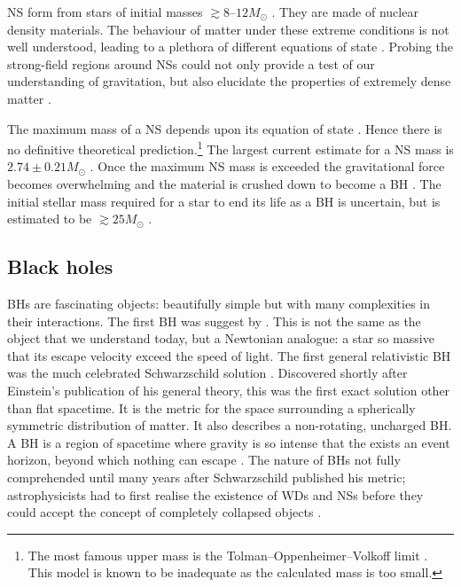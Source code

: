 NS form from stars of initial masses $\gtrsim 8$--$12 M_\odot$ \citep{Woosley2002,Poelarends2008,Langer2012}. They are made of nuclear density materials. The behaviour of matter under these extreme conditions is not well understood, leading to a plethora of different equations of state \citep{Lattimer2012}. Probing the strong-field regions around NSs could not only provide a test of our understanding of gravitation, but also elucidate the properties of extremely dense matter \citep[e.g.,][]{Read2009,Ozel2009,Lackey2012}.

The maximum mass of a NS depends upon its equation of state \citep[section 9.3]{Shapiro1983}. Hence there is no definitive theoretical prediction.\footnote{The most famous upper mass is the Tolman--Oppenheimer--Volkoff limit \citep{Tolman1939,Oppenheimer1939}. This model is known to be inadequate as the calculated mass is too small.} The largest current estimate for a NS mass is $2.74 \pm 0.21 M_\odot$ \citep{Freire2008,Ozel2012}. Once the maximum NS mass is exceeded the gravitational force becomes overwhelming and the material is crushed down to become a BH \citep[section 12.1]{Shapiro1983}. The initial stellar mass required for a star to end its life as a BH is uncertain, but is estimated to be $\gtrsim 25 M_\odot$ \citep{Woosley2002,Tauris2011}.

\subsection{Black holes}

BHs are fascinating objects: beautifully simple but with many complexities in their interactions. The first BH was suggest by \citet{Michell1784}. This is not the same as the object that we understand today, but a Newtonian analogue: a star so massive that its escape velocity exceed the speed of light. The first general relativistic BH was the much celebrated Schwarzschild solution \citep{Schwarzschild1916}. Discovered shortly after Einstein's publication of his general theory, this was the first exact solution other than flat spacetime. It is the metric for the space surrounding a spherically symmetric distribution of matter. It also describes a non-rotating, uncharged BH. A BH is a region of spacetime where gravity is so intense that the exists an event horizon, beyond which nothing can escape \citep[section 33.1]{Misner1973}. The nature of BHs not fully comprehended until many years after Schwarzschild published his metric; astrophysicists had to first realise the existence of WDs and NSs before they could accept the concept of completely collapsed objects \citep{Israel1987}.

